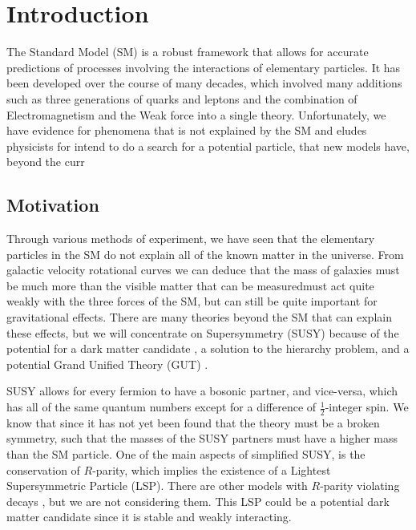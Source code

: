 \chapter{Introduction}
\label{ch:Intro}

The Standard Model (SM) \cite{gaillard_standard_1999} is a robust framework that allows for accurate predictions of processes involving the interactions of elementary particles. It has been developed over the course of many decades, which involved many additions such as three generations of quarks and leptons and the combination of Electromagnetism and the Weak force into a single theory. Unfortunately, we have evidence for phenomena that is not explained by the SM and eludes physicists for intend to do a search for a potential particle, that new models have, beyond the curr
\section{Motivation}
\label{sec:Motivation}

Through various methods of experiment, we have seen that the elementary particles in the SM do not explain all of the known matter in the universe. From galactic velocity rotational curves we can deduce that the mass of galaxies must be much more than the visible matter that can be measuredmust act quite weakly with the three forces of the SM, but can still be quite important for gravitational effects. There are many theories beyond the SM that can explain these effects, but we will concentrate on Supersymmetry (SUSY) \cite{ramond_dual_1971, volkov_possible_1972, wess_supergauge_1974, fayet_supergauge_1975, barbieri_gauge_1982, chamseddine_locally_1982, hall_supergravity_1983, kane_study_1994, papucci_natural_2012} because of the potential for a dark matter candidate \cite{feng_dark_2010, bertone_dark_2005}, a solution to the hierarchy problem, and a potential Grand Unified Theory (GUT) \cite{georgi_unity_1974, georgi_hierarchy_1974, buras_aspects_1978}.

SUSY allows for every fermion to have a bosonic partner, and vice-versa, which has all of the same quantum numbers except for a difference of $\frac{1}{2}$-integer spin. We know that since it has not yet been found that the theory must be a broken symmetry, such that the masses of the SUSY partners must have a higher mass than the SM particle. One of the main aspects of simplified SUSY, is the conservation of $R$-parity, which implies the existence of a Lightest Supersymmetric Particle (LSP). There are other models with $R$-parity violating decays \cite{barbier_r-parity-violating_2005, grossman_sneutrino_1999}, but we are not considering them. This LSP could be a potential dark matter candidate since it is stable and weakly interacting. 

